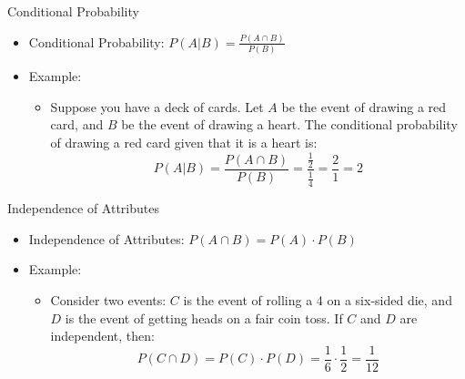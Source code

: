 \documentclass{beamer}
\begin{document}
\begin{frame}{Conditional Probability}
  \begin{itemize}
    \item Conditional Probability: \( P(A | B) = \frac{P(A \cap B)}{P(B)} \)
    \item Example:
      \begin{itemize}
        \item Suppose you have a deck of cards. Let \( A \) be the event of drawing a red card, and \( B \) be the event of drawing a heart. The conditional probability of drawing a red card given that it is a heart is:
        \[ P(A | B) = \frac{P(A \cap B)}{P(B)} = \frac{\frac{1}{2}}{\frac{1}{4}} = \frac{2}{1} = 2 \]
      \end{itemize}
  \end{itemize}
\end{frame}

\begin{frame}{Independence of Attributes}
  \begin{itemize}
    \item Independence of Attributes: \( P(A \cap B) = P(A) \cdot P(B) \)
    \item Example:
      \begin{itemize}
        \item Consider two events: \( C \) is the event of rolling a 4 on a six-sided die, and \( D \) is the event of getting heads on a fair coin toss. If \( C \) and \( D \) are independent, then:
        \[ P(C \cap D) = P(C) \cdot P(D) = \frac{1}{6} \cdot \frac{1}{2} = \frac{1}{12} \]
      \end{itemize}
  \end{itemize}
\end{frame}
\end{document}
